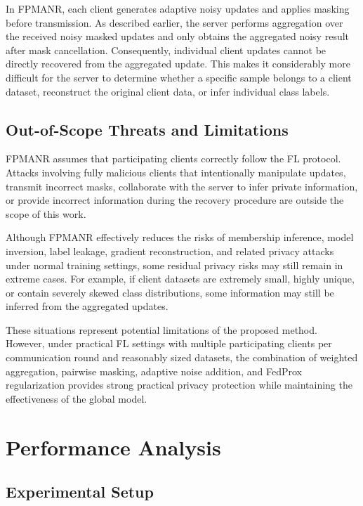 \documentclass[a4paper,fleqn]{cas-dc}
\begin{document}
In FPMANR, each client generates adaptive noisy updates and applies masking before transmission. As described earlier, the server performs aggregation over the received noisy masked updates and only obtains the aggregated noisy result after mask cancellation. Consequently, individual client updates cannot be directly recovered from the aggregated update. This makes it considerably more difficult for the server to determine whether a specific sample belongs to a client dataset, reconstruct the original client data, or infer individual class labels.

\subsection{Out-of-Scope Threats and Limitations}

FPMANR assumes that participating clients correctly follow the FL protocol. Attacks involving fully malicious clients that intentionally manipulate updates, transmit incorrect masks, collaborate with the server to infer private information, or provide incorrect information during the recovery procedure are outside the scope of this work.

Although FPMANR effectively reduces the risks of membership inference, model inversion, label leakage, gradient reconstruction, and related privacy attacks under normal training settings, some residual privacy risks may still remain in extreme cases. For example, if client datasets are extremely small, highly unique, or contain severely skewed class distributions, some information may still be inferred from the aggregated updates.

These situations represent potential limitations of the proposed method. However, under practical FL settings with multiple participating clients per communication round and reasonably sized datasets, the combination of weighted aggregation, pairwise masking, adaptive noise addition, and FedProx regularization provides strong practical privacy protection while maintaining the effectiveness of the global model.

\section{Performance Analysis}
\label{sec:6}

\subsection{Experimental Setup}
\end{document}
